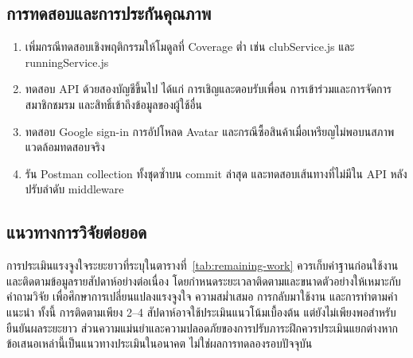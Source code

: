\subsection{การทดสอบและการประกันคุณภาพ}

\begin{enumerate}[label=\arabic*)]
    \item เพิ่มกรณีทดสอบเชิงพฤติกรรมให้โมดูลที่ Coverage ต่ำ เช่น clubService.js และ runningService.js
    \item ทดสอบ API ด้วยสองบัญชีขึ้นไป ได้แก่ การเชิญและตอบรับเพื่อน การเข้าร่วมและการจัดการสมาชิกชมรม และสิทธิ์เข้าถึงข้อมูลของผู้ใช้อื่น
    \item ทดสอบ Google sign-in การอัปโหลด Avatar และกรณีซื้อสินค้าเมื่อเหรียญไม่พอบนสภาพแวดล้อมทดสอบจริง
    \item รัน Postman collection ทั้งชุดซ้ำบน commit ล่าสุด และทดสอบเส้นทางที่ไม่มีใน API หลังปรับลำดับ middleware
\end{enumerate}

\subsection{แนวทางการวิจัยต่อยอด}

การประเมินแรงจูงใจระยะยาวที่ระบุในตารางที่~\ref{tab:remaining-work} ควรเก็บค่าฐานก่อนใช้งานและติดตามข้อมูลรายสัปดาห์อย่างต่อเนื่อง โดยกำหนดระยะเวลาติดตามและขนาดตัวอย่างให้เหมาะกับคำถามวิจัย เพื่อศึกษาการเปลี่ยนแปลงแรงจูงใจ ความสม่ำเสมอ การกลับมาใช้งาน และการทำตามคำแนะนำ ทั้งนี้ การติดตามเพียง 2--4 สัปดาห์อาจใช้ประเมินแนวโน้มเบื้องต้น แต่ยังไม่เพียงพอสำหรับยืนยันผลระยะยาว ส่วนความแม่นยำและความปลอดภัยของการปรับภาระฝึกควรประเมินแยกต่างหาก ข้อเสนอเหล่านี้เป็นแนวทางประเมินในอนาคต ไม่ใช่ผลการทดลองรอบปัจจุบัน
